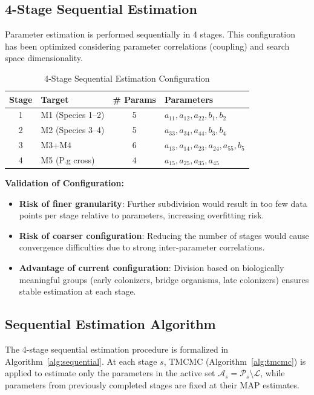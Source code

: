 \documentclass[11pt,a4paper]{article}
\begin{document}
\subsection{4-Stage Sequential Estimation}

Parameter estimation is performed sequentially in 4 stages. This configuration has been optimized considering parameter correlations (coupling) and search space dimensionality.

\begin{table}[h]
\centering
\small
\begin{tabular}{clcl}
\toprule
\textbf{Stage} & \textbf{Target} & \textbf{\# Params} & \textbf{Parameters} \\
\midrule
1 & M1 (Species 1--2) & 5 & $a_{11}, a_{12}, a_{22}, b_1, b_2$ \\
2 & M2 (Species 3--4) & 5 & $a_{33}, a_{34}, a_{44}, b_3, b_4$ \\
3 & M3+M4 & 6 & $a_{13}, a_{14}, a_{23}, a_{24}, a_{55}, b_5$ \\
4 & M5 (P.g cross) & 4 & $a_{15}, a_{25}, a_{35}, a_{45}$ \\
\bottomrule
\end{tabular}
\caption{4-Stage Sequential Estimation Configuration}
\label{tab:stages}
\end{table}

\textbf{Validation of Configuration:}
\begin{itemize}
    \item \textbf{Risk of finer granularity}: Further subdivision would result in too few data points per stage relative to parameters, increasing overfitting risk.

    \item \textbf{Risk of coarser configuration}: Reducing the number of stages would cause convergence difficulties due to strong inter-parameter correlations.

    \item \textbf{Advantage of current configuration}: Division based on biologically meaningful groups (early colonizers, bridge organisms, late colonizers) ensures stable estimation at each stage.
\end{itemize}

\subsection{Sequential Estimation Algorithm}
\label{sec:sequential_algorithm}

The 4-stage sequential estimation procedure is formalized in Algorithm~\ref{alg:sequential}. At each stage $s$, TMCMC (Algorithm~\ref{alg:tmcmc}) is applied to estimate only the parameters in the active set $\mathcal{A}_s = \mathcal{P}_s \setminus \mathcal{L}$, while parameters from previously completed stages are fixed at their MAP estimates.
\end{document}
